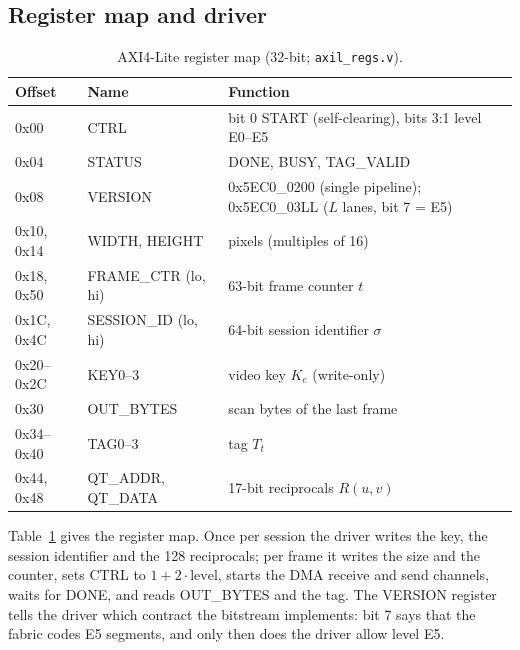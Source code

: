 \subsection{Register map and driver}\label{sec:regs}
\begin{table}[t]
\caption{AXI4-Lite register map (32-bit; \texttt{axil\_regs.v}).}
\label{tab:regs}
\centering\small\setlength{\tabcolsep}{3pt}
\begin{tabular}{lll}
\toprule
Offset & Name & Function \\
\midrule
0x00 & CTRL & bit 0 START (self-clearing), bits 3:1 level E0--E5 \\
0x04 & STATUS & DONE, BUSY, TAG\_VALID \\
0x08 & VERSION & 0x5EC0\_0200 (single pipeline); 0x5EC0\_03LL ($L$ lanes, bit 7 = E5) \\
0x10, 0x14 & WIDTH, HEIGHT & pixels (multiples of 16) \\
0x18, 0x50 & FRAME\_CTR (lo, hi) & 63-bit frame counter $t$ \\
0x1C, 0x4C & SESSION\_ID (lo, hi) & 64-bit session identifier $\sigma$ \\
0x20--0x2C & KEY0--3 & video key $K_e$ (write-only) \\
0x30 & OUT\_BYTES & scan bytes of the last frame \\
0x34--0x40 & TAG0--3 & tag $T_t$ \\
0x44, 0x48 & QT\_ADDR, QT\_DATA & 17-bit reciprocals $R(u, v)$ \\
\bottomrule
\end{tabular}
\end{table}
Table~\ref{tab:regs} gives the register map. Once per session the driver writes the key, the session identifier and the 128 reciprocals; per frame it writes the size and the counter, sets CTRL to $1 + 2 \cdot \text{level}$, starts the DMA receive and send channels, waits for DONE, and reads OUT\_BYTES and the tag. The VERSION register tells the driver which contract the bitstream implements: bit 7 says that the fabric codes E5 segments, and only then does the driver allow level E5.

